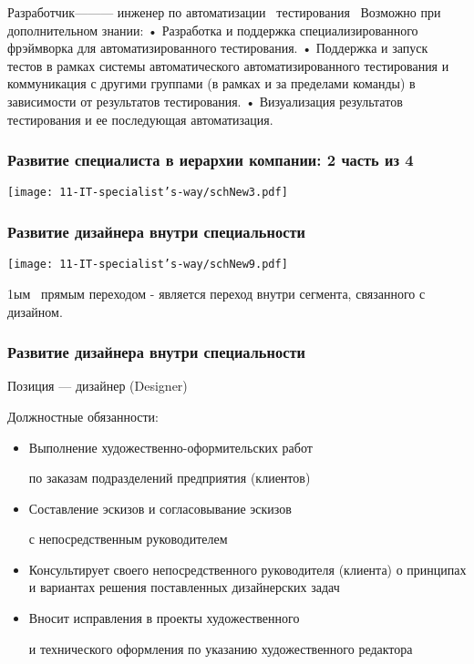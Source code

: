 \documentclass{../industrial-development}
\begin{document}
Разработчик--------- инженер по автоматизации~\cite{hh} тестирования~\cite{itcf}
Возможно при дополнительном знании:
•	Разработка и поддержка специализированного фрэймворка для автоматизированного тестирования.
•	Поддержка и запуск тестов в рамках системы автоматического автоматизированного тестирования и коммуникация с другими группами (в рамках и за пределами команды) в зависимости от результатов тестирования.
•	Визуализация результатов тестирования и ее последующая автоматизация.


\begin{frame} \frametitle{Развитие  специалиста в иерархии компании: 2 часть из 4 }
  \centerline{\texttt{[image: 11-IT-specialist's-way/schNew3.pdf]}}
\end{frame}

\begin{frame} \frametitle{Развитие дизайнера внутри специальности}
  \centerline{\texttt{[image: 11-IT-specialist's-way/schNew9.pdf]}}
\end{frame}

\lecturenotes

 1ым~\cite{mc} прямым переходом  - является переход внутри сегмента, связанного с дизайном.

\begin{frame} \frametitle{Развитие дизайнера внутри специальности}
 \begin{block}{}
  \alert{Позиция --- дизайнер (Designer)}

Должностные обязанности: 
  \end{block}
  \begin{itemize}
  \item  Выполнение художественно-оформительских работ 

по заказам подразделений предприятия (клиентов)
  \item  Составление эскизов и согласовывание эскизов 

с непосредственным руководителем 
  \item Консультирует своего непосредственного руководителя (клиента) о принципах и вариантах решения поставленных дизайнерских задач
 \item  Вносит исправления в проекты художественного 

и технического оформления по указанию художественного редактора
  \end{itemize}
\end{frame}

\lecturenotes
\end{document}
